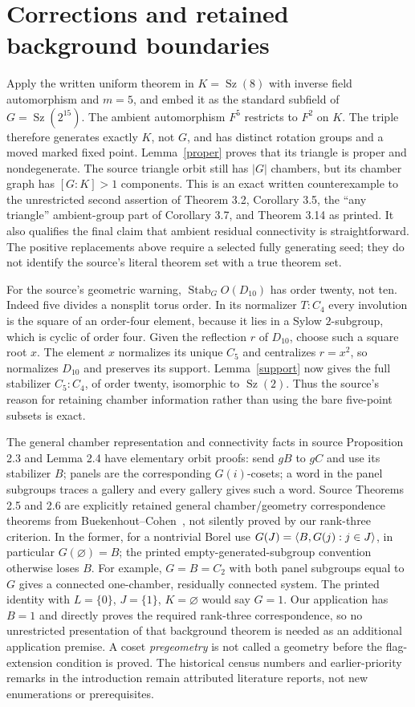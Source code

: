 \documentclass[11pt,a4paper]{article}
\newcommand{\Sz}{\operatorname{Sz}}\newcommand{\Aut}{\operatorname{Aut}}
\begin{document}
\section{Corrections and retained background boundaries}
Apply the written uniform theorem in $K=\Sz(8)$ with inverse field
automorphism and $m=5$, and embed it as the standard subfield of
$G=\Sz(2^{15})$. The ambient automorphism $F^5$ restricts to $F^2$ on $K$.
The triple therefore generates exactly $K$, not $G$, and has distinct
rotation groups and a moved marked fixed point. Lemma~\ref{proper} proves
that its triangle is proper and nondegenerate. The source triangle orbit
still has $|G|$ chambers, but its chamber graph has $[G:K]>1$ components.
This is an exact written counterexample to the unrestricted second
assertion of Theorem 3.2, Corollary 3.5, the ``any triangle'' ambient-group
part of Corollary 3.7, and Theorem 3.14 as printed. It also qualifies the
final claim that ambient residual connectivity is straightforward.
The positive replacements above require a selected fully generating seed;
they do not identify the source's literal theorem set with a true theorem set.

For the source's geometric warning, $\operatorname{Stab}_G O(D_{10})$
has order twenty, not ten. Indeed five divides a nonsplit torus order.
In its normalizer $T:C_4$ every involution is the square of an order-four
element, because it lies in a Sylow $2$-subgroup, which is cyclic of order four.
Given the reflection $r$ of $D_{10}$, choose such a square root $x$.
The element $x$ normalizes its unique $C_5$ and centralizes $r=x^2$,
so normalizes $D_{10}$ and preserves its support. Lemma~\ref{support}
now gives the full stabilizer $C_5:C_4$, of order twenty, isomorphic
to $\Sz(2)$. Thus the source's reason for retaining chamber information
rather than using the bare five-point subsets is exact.

The general chamber representation and connectivity facts in source
Proposition 2.3 and Lemma 2.4 have elementary orbit proofs: send $gB$ to
$gC$ and use its stabilizer $B$; panels are the corresponding $G(i)$-cosets;
a word in the panel subgroups traces a gallery and every gallery gives
such a word. Source Theorems 2.5 and 2.6 are explicitly retained general
chamber/geometry correspondence theorems from Buekenhout--Cohen~\cite{BC},
not silently proved by our rank-three criterion. In the former, for a
nontrivial Borel use $G(J)=\langle B,G(j):j\in J\rangle$, in particular $G(\varnothing)=B$;
the printed empty-generated-subgroup convention otherwise loses $B$.
For example, $G=B=C_2$ with both panel subgroups equal to $G$ gives a
connected one-chamber, residually connected system. The printed identity
with $L=\{0\}$, $J=\{1\}$, $K=\varnothing$ would say $G=1$.
Our application has $B=1$ and directly proves the required rank-three
correspondence, so no unrestricted presentation of that background theorem
is needed as an additional application premise. A coset \emph{pregeometry}
is not called a geometry before the flag-extension condition is proved.
The historical census numbers and earlier-priority remarks in the introduction
remain attributed literature reports, not new enumerations or prerequisites.
\end{document}
